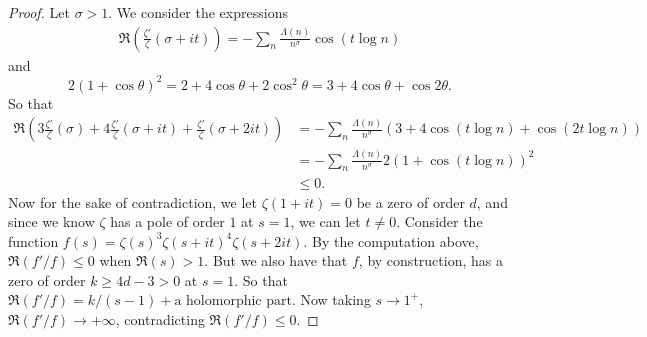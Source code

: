 \begin{proof}%
    Let $\sigma > 1$. We consider the expressions \begin{align*}
        \Re\left(\frac{\zeta'}{\zeta}(\sigma+it)\right) = -\sum_{n} \frac{\Lambda(n)}{n^\sigma}\cos (t\log n) 
    \end{align*}
    and \[
    2(1+\cos \theta)^2 =2+4\cos \theta + 2\cos^2 \theta = 3+4\cos\theta + \cos 2\theta.
    \]
    So that \begin{align*}
        \Re\left(3\frac{\zeta'}{\zeta}(\sigma)+ 4\frac{\zeta'}{\zeta}(\sigma+it) +\frac{\zeta'}{\zeta}(\sigma+2it)\right)
        &= -\sum_{n} \frac{\Lambda(n)}{n^\sigma}(3+4\cos (t\log n)+\cos (2t\log n))\\
        &= -\sum_{n} \frac{\Lambda(n)}{n^\sigma} 2(1+\cos( t\log n))^2\\
        &\leq 0.
    \end{align*}
    Now for the sake of contradiction, we let $\zeta(1+it)=0$ be a zero of order $d$, and since we know $\zeta$ has a pole of order $1$ at $s=1$, we can let $t\neq 0$. 
    Consider the function $f(s)=\zeta(s)^3\zeta(s+it)^4\zeta(s+2it)$.
    By the computation above, $\Re(f'/f)\leq 0$ when $\Re(s)> 1$.
    But we also have that $f$, by construction, has a zero of order $k\geq 4d-3>0$ at $s=1$.
    So that $\Re(f'/f) = k/(s-1)+ \textrm{a holomorphic part}$. Now taking $s\to 1^{+}$, $\Re(f'/f)\to +\infty$, contradicting $\Re(f'/f)\leq 0$.
\end{proof}

